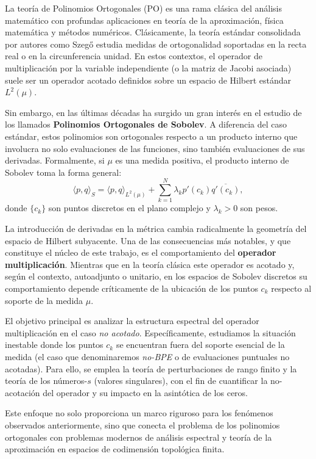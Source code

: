 \documentclass[12pt,a4paper]{article}
\theoremstyle{definition}
\theoremstyle{remark}
\begin{document}
La teoría de Polinomios Ortogonales (PO) es una rama clásica del análisis matemático con profundas aplicaciones en teoría de la aproximación, física matemática y métodos numéricos. Clásicamente, la teoría estándar consolidada por autores como Szegő estudia medidas de ortogonalidad soportadas en la recta real o en la circunferencia unidad. En estos contextos, el operador de multiplicación por la variable independiente (o la matriz de Jacobi asociada) suele ser un operador acotado definidos sobre un espacio de Hilbert estándar $L^2(\mu)$.

Sin embargo, en las últimas décadas ha surgido un gran interés en el estudio de los llamados \textbf{Polinomios Ortogonales de Sobolev}. A diferencia del caso estándar, estos polinomios son ortogonales respecto a un producto interno que involucra no solo evaluaciones de las funciones, sino también evaluaciones de sus derivadas. Formalmente, si $\mu$ es una medida positiva, el producto interno de Sobolev toma la forma general:
\begin{equation}
	\langle p, q \rangle_S = \langle p, q \rangle_{L^2(\mu)} + \sum_{k=1}^N \lambda_k p'(c_k) \overline{q'(c_k)},
\end{equation}
donde $\{c_k\}$ son puntos discretos en el plano complejo y $\lambda_k > 0$ son pesos.

La introducción de derivadas en la métrica cambia radicalmente la geometría del espacio de Hilbert subyacente. Una de las consecuencias más notables, y que constituye el núcleo de este trabajo, es el comportamiento del \textbf{operador multiplicación}. Mientras que en la teoría clásica este operador es acotado y, según el contexto, autoadjunto o unitario, en los espacios de Sobolev discretos su comportamiento depende críticamente de la ubicación de los puntos $c_k$ respecto al soporte de la medida $\mu$.

El objetivo principal es analizar la estructura espectral del operador multiplicación en el caso \textit{no acotado}. Específicamente, estudiamos la situación inestable donde los puntos $c_k$ se encuentran fuera del soporte esencial de la medida (el caso que denominaremos \textit{no-BPE} o de evaluaciones puntuales no acotadas). Para ello, se emplea la teoría de perturbaciones de rango finito y la teoría de los números-$s$ (valores singulares), con el fin de cuantificar la no-acotación del operador y su impacto en la asintótica de los ceros.

Este enfoque no solo proporciona un marco riguroso para los fenómenos observados anteriormente, sino que conecta el problema de los polinomios ortogonales con problemas modernos de análisis espectral y teoría de la aproximación en espacios de codimensión topológica finita.
\end{document}
